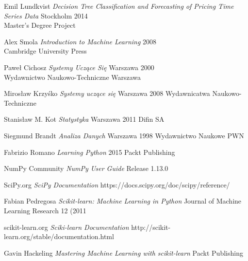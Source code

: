 \documentclass[man,mfi|min|mpt|mok|mub|mza|miz|bsp]{mgrwms}
\begin{document}
\begin{thebibliography}{88}
 Emil Lundkvist
\textit{Decision Tree Classiﬁcation and Forecasting of Pricing Time Series Data} Stockholm 2014\\
Master’s Degree Project

 Alex Smola
\textit{Introduction to Machine Learning} 2008\\
Cambridge University Press

 Paweł Cichosz
\textit{Systemy Uczące Się} Warszawa 2000\\
Wydawnictwo Naukowo-Techniczne Warszawa

 Mirosław Krzyśko
\textit{Systemy uczące się} Warszawa 2008
Wydawnicatwa Naukowo-Techniczne

 Stanisław M. Kot
\textit{Statystyka} Warszawa 2011
Difin SA

 Siegmund Brandt
\textit{Analiza Danych} Warszawa 1998
Wydawnictwo Naukowe PWN

 Fabrizio Romano
\textit{Learning Python} 2015
Packt Publishing

 NumPy Community
\textit{NumPy User Guide} Release 1.13.0

 SciPy.org
\textit{SciPy Documentation}
https://docs.scipy.org/doc/scipy/reference/

 Fabian Pedregosa
\textit{Scikit-learn: Machine Learning in Python}
Journal of Machine Learning Research 12 (2011

 scikit-learn.org
\textit{Sciki-learn Documentation}
http://scikit-learn.org/stable/documentation.html

 Gavin Hackeling
\textit{Mastering Machine Learning with scikit-learn}
Packt Publishing


\end{thebibliography}
%
%  
%
\listoffigures
%
\listoftables
%
\end{document}
